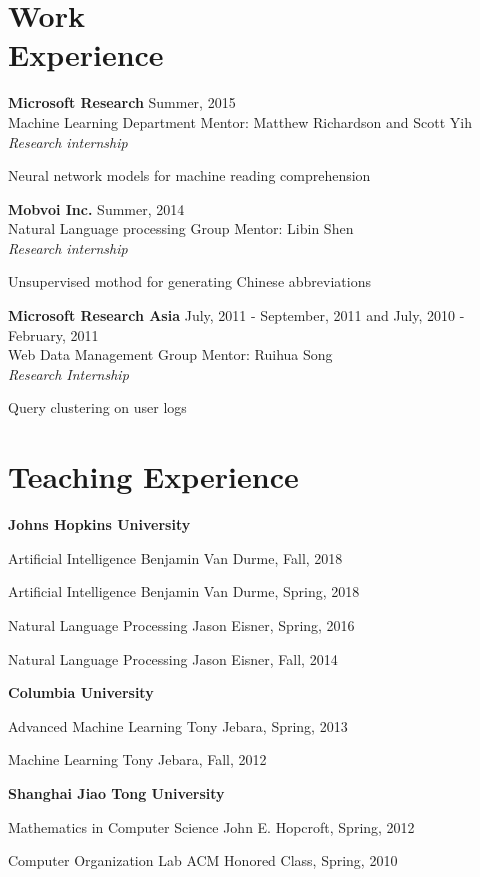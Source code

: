 \documentclass[margin,line]{res}
\newenvironment{list1}{
  \begin{list}{\ding{113}}{%
      \setlength{\itemsep}{0in}
      \setlength{\parsep}{0in} \setlength{\parskip}{0in}
      \setlength{\topsep}{0in} \setlength{\partopsep}{0in} 
      \setlength{\leftmargin}{0.17in}}}{\end{list}}
\begin{document}
\begin{resume}
\section{\sc Work\\ Experience}
{\bf Microsoft Research} \hfill{Summer, 2015}\\
Machine Learning Department \hfill{Mentor: Matthew Richardson and Scott Yih}\\
{\em Research internship}
\begin{list1}
\item[] Neural network models for machine reading comprehension 
\end{list1}
{\bf Mobvoi Inc.} \hfill{Summer, 2014}\\
Natural Language processing Group \hfill{Mentor: Libin Shen}\\
{\em Research internship}
\begin{list1}
\item[] Unsupervised mothod for generating Chinese abbreviations 
\end{list1}
{\bf Microsoft Research Asia} \hfill{ July, 2011 - September, 2011 and July, 2010 - February, 2011}\\
Web Data Management Group \hfill{Mentor: Ruihua Song}\\
{\em Research Internship}
\begin{list1}
\item[] Query clustering on user logs
\end{list1}
\section{\sc Teaching Experience}
{\bf Johns Hopkins University}
\begin{list1}
\item[] Artificial Intelligence \hfill{Benjamin Van Durme, Fall, 2018}
\item[] Artificial Intelligence \hfill{Benjamin Van Durme, Spring, 2018}
\item[] Natural Language Processing \hfill{Jason Eisner, Spring, 2016}
\item[] Natural Language Processing \hfill{Jason Eisner, Fall, 2014}
\end{list1}
{\bf Columbia University}
\begin{list1}
\item[] Advanced Machine Learning \hfill{Tony Jebara, Spring, 2013}
\item[] Machine Learning \hfill{Tony Jebara, Fall, 2012}
\end{list1}
{\bf Shanghai Jiao Tong University}
\begin{list1}
\item[] Mathematics in Computer Science \hfill{John E. Hopcroft, Spring, 2012}
\item[] Computer Organization Lab \hfill{ACM Honored Class, Spring, 2010}
\end{list1}

\end{resume}
\end{document}
